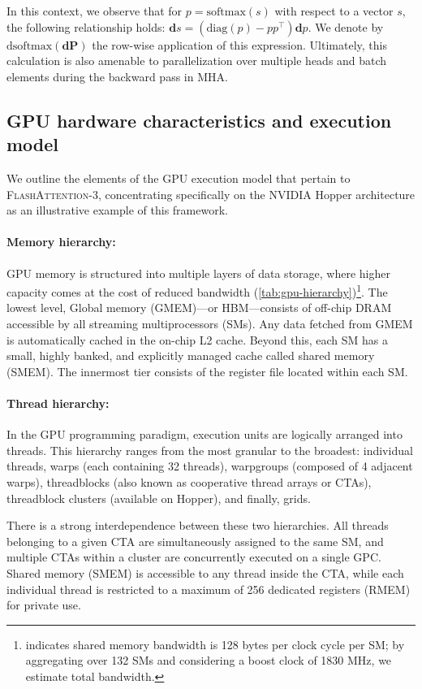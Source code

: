 \begin{enumerate}
In this context, we observe that for $p = \mathrm{softmax}(s)$ with respect to a vector $s$, the following relationship holds: $\mathbf{d}s = (\mathrm{diag}(p) - p p^\top)\mathbf{d}p$. We denote by $\mathrm{dsoftmax}(\mathbf{dP})$ the row-wise application of this expression. Ultimately, this calculation is also amenable to parallelization over multiple heads and batch elements during the backward pass in MHA.

\subsection{GPU hardware characteristics and execution model}
\label{subsec:hardware}

We outline the elements of the GPU execution model that pertain to \textsc{FlashAttention-3}, concentrating specifically on the NVIDIA Hopper architecture as an illustrative example of this framework.

\paragraph{Memory hierarchy:} GPU memory is structured into multiple layers of data storage, where higher capacity comes at the cost of reduced bandwidth (\cref{tab:gpu-hierarchy})\footnote{\citet{luo2024benchmarking} indicates shared memory bandwidth is 128 bytes per clock cycle per SM; by aggregating over 132 SMs and considering a boost clock of 1830 MHz, we estimate total bandwidth.}. The lowest level, Global memory (GMEM)—or HBM—consists of off-chip DRAM accessible by all streaming multiprocessors (SMs). Any data fetched from GMEM is automatically cached in the on-chip L2 cache. Beyond this, each SM has a small, highly banked, and explicitly managed cache called shared memory (SMEM). The innermost tier consists of the register file located within each SM.

\paragraph{Thread hierarchy:} In the GPU programming paradigm, execution units are logically arranged into threads. This hierarchy ranges from the most granular to the broadest: individual threads, warps (each containing 32 threads), warpgroups (composed of 4 adjacent warps), threadblocks (also known as cooperative thread arrays or CTAs), threadblock clusters (available on Hopper), and finally, grids.

There is a strong interdependence between these two hierarchies. All threads belonging to a given CTA are simultaneously assigned to the same SM, and multiple CTAs within a cluster are concurrently executed on a single GPC. Shared memory (SMEM) is accessible to any thread inside the CTA, while each individual thread is restricted to a maximum of 256 dedicated registers (RMEM) for private use.


\end{enumerate}
